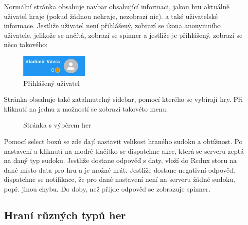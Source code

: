 \documentclass[a4paper,oneside,12pt]{report}
\begin{document}
Normální stránka obsahuje navbar obsahující informaci, jakou hru aktuálně uživatel hraje (pokud žádnou nehraje, nezobrazí nic). a také uživatelské informace. Jestliže uživatel není přihlášený, zobrazí se ikona anonymního uživatele, jelikože se načítá, zobrazí se spinner a jestliže je přihlášený, zobrazí se něco takového:

\begin{figure}[H]
   \centering
   \includegraphics[width=0.3\textwidth]{../img/vladimirIcon.jpg}
   \caption[Přihlášený uživatel]{Přihlášený uživatel}
   \label{fig:architecture}
\end{figure}

Stránka obsahuje také zatahnutelný sidebar, pomocí kterého se vybírají hry. Při kliknutí na jednu z možností se zobrazí takovéto menu:

\begin{figure}[H]
   \centering
   \caption[Stránka s výběrem her]{Stránka s výběrem her}
   \label{fig:architecture}
\end{figure}

Pomocí select boxů se zde dají nastavit velikost hraného sudoku a obtížnost. Po nastavení a kliknutí na modré tlačítko se dispatchne akce, která se serveru zeptá na daný typ sudoku. Jestliže dostane odpověď s daty, vloží do Redux storu na dané místo data pro hru a je možné hrát. Jestliže dostane negativní odpověď, dispatchne se notifikace, že pro dané nastavení není na serveru žádné sudoku, popř. jinou chybu. Do doby, než přijde odpověď se zobrazuje spinner.

\subsection{Hraní různých typů her}
\end{document}
